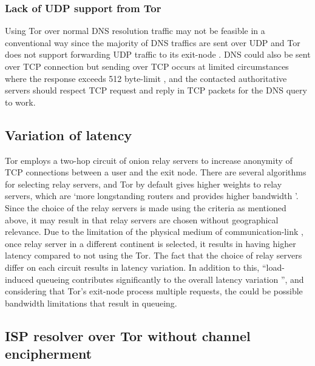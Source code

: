 \subsubsection{Lack of UDP support from Tor}
Using Tor over normal DNS resolution traffic may not be feasible in a conventional way since the majority of DNS traffics are sent over UDP and Tor does not support forwarding UDP traffic to its exit-node \cite{udp-over-tor, dingledine2004tor}.
DNS could also be sent over TCP connection but sending over TCP occurs at limited circumstances where the response exceeds 512 byte-limit \cite{rfc7766}, and the contacted authoritative servers should respect TCP request and reply in TCP packets for the DNS query to work.

\subsection{Variation of latency}
Tor employs a two-hop circuit of onion relay servers to increase anonymity of TCP connections between a user and the exit node.
There are several algorithms for selecting relay servers, and Tor by default gives higher weights to relay servers, which are `more longstanding routers and provides higher bandwidth \cite{wacek2013empirical}'.
Since the choice of the relay servers is made using the criteria as mentioned above, it may result in that relay servers are chosen without geographical relevance.
Due to the limitation of the physical medium of communication-link \cite{Singla:2014:ISL}, once relay server in a different continent is selected, it results in having higher latency compared to not using the Tor.
The fact that the choice of relay servers differ on each circuit results in latency variation. In addition to this, ``load-induced queueing contributes significantly to the overall latency variation \cite{Hoiland-Jorgensen:2016}'', and considering that Tor's exit-node process multiple requests, the could be possible bandwidth limitations that result in queueing. 

\subsection{ISP resolver over Tor without channel encipherment}
